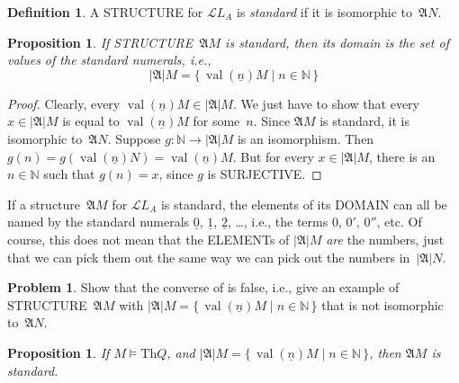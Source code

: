 \documentclass[10pt,a4paper]{article}
\makeatletter
\newcommand*{\olup}[1]{\MakeUppercase{#1}}
\theoremstyle{plain}
\newtheorem{prop}[thm]{Proposition}
\theoremstyle{definition}
\newtheorem{defn}[thm]{Definition}
\newtheorem{prob}{Problem}[section]
\theoremstyle{remark}
\newenvironment{explain}{}{}
\newcommand*{\ollabel}[1]{\label{#1}}
\newcommand{\olref}{\@ifnextchar[{\olref@i}{\olref@final}}
\def\olref@i[#1]{\@ifnextchar[{\olref@ii}{\olref@final}}
\def\olref@ii[#1]{\@ifnextchar[{\olref@iii}{\olref@final}}
\def\olref@iii[#1]{\olref@final}
\def\olref@final#1{\ref{#1}}
\providecommand{\Obj}{}
\providecommand{\Struct}{\ensuremath{\mathfrak{A}}}
\providecommand{\Domain}{\ensuremath{|\mathfrak{A}|}}
\providecommand{\Sat}[2]{\ensuremath{#1 \models #2}}
\providecommand{\Lang}{\ensuremath{\mathcal{L}}}
\providecommand{\Th}{\ensuremath{\mathrm{Th}}}
\providecommand{\num}[1]{\underline{#1}}
\providecommand{\Nat}{\ensuremath{\mathbb{N}}}
\providecommand{\Setabs}[2]{\{\, #1 \mid #2 \,\}}
\providecommand{\Value}[1]{\operatorname{val}(#1)}
\makeatother
\begin{document}
\begin{defn}
A \olup{structure} for $\Lang{L_A}$ is \emph{standard} if it is
isomorphic to~$\Struct{N}$.
\end{defn}

\begin{prop}
\ollabel{prop:standard-domain} If \olup{structure}~$\Struct{M}$ is standard,
then its domain is the set of values of the standard numerals, i.e.,
\[
\Domain{M} = \Setabs{\Value{\num{n}}{M}}{n \in \Nat}
\]
\end{prop}

\begin{proof}
Clearly, every $\Value{\num{n}}{M} \in \Domain{M}$. We just have to
show that every $x \in \Domain{M}$ is equal to $\Value{\num{n}}{M}$
for some~$n$.  Since $\Struct{M}$ is standard, it is isomorphic
to~$\Struct{N}$. Suppose $g\colon \Nat \to \Domain{M}$ is an
isomorphism. Then $g(n) = g(\Value{\num{n}}{N}) =
\Value{\num{n}}{M}$. But for every $x \in \Domain{M}$, there is an~$n
\in \Nat$ such that $g(n) = x$, since $g$ is \olup{surjective}.
\end{proof}

\begin{explain}
If a structure~$\Struct{M}$ for $\Lang{L_A}$ is standard, the elements
of its \olup{domain} can all be named by the standard numerals $\num{0}$,
$\num{1}$, $\num{2}$, \dots, i.e., the terms $\Obj{0}$, $\Obj{0}'$,
$\Obj{0}''$, etc. Of course, this does not mean that the \olup{element}s
of $\Domain{M}$ \emph{are} the numbers, just that we can pick them out
the same way we can pick out the numbers in~$\Domain{N}$.
\end{explain}

\begin{prob}
Show that the converse of \olref[mod][mar][stm]{prop:standard-domain}
is false, i.e., give an example of \olup{structure}~$\Struct{M}$ with
$\Domain{M} = \Setabs{\Value{\num{n}}{M}}{n \in \Nat}$ that is not
isomorphic to~$\Struct{N}$.
\end{prob}

\begin{prop}
\ollabel{prop:thq-standard}
If $\Sat{M}{\Th{Q}}$, and $\Domain{M} = \Setabs{\Value{\num{n}}{M}}{n
  \in \Nat}$, then $\Struct{M}$ is standard.
\end{prop}
\end{document}
